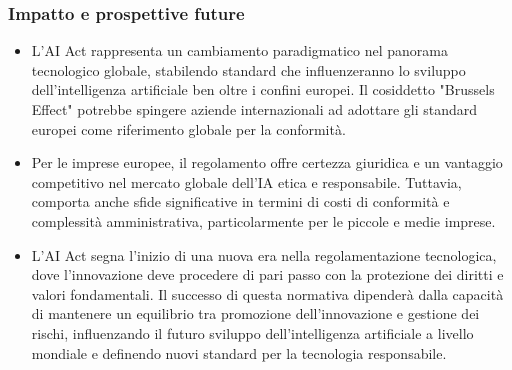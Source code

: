 \documentclass{beamer}
\begin{document}
%
%
\begin{frame}
\frametitle{Impatto e prospettive future}
\begin{itemize}
\small
\item L'AI Act rappresenta un cambiamento paradigmatico nel panorama tecnologico globale, stabilendo standard che influenzeranno lo sviluppo dell'intelligenza artificiale ben oltre i confini europei. Il cosiddetto "Brussels Effect" potrebbe spingere aziende internazionali ad adottare gli standard europei come riferimento globale per la conformità.

\item Per le imprese europee, il regolamento offre certezza giuridica e un vantaggio competitivo nel mercato globale dell'IA etica e responsabile. Tuttavia, comporta anche sfide significative in termini di costi di conformità e complessità amministrativa, particolarmente per le piccole e medie imprese.

\item L'AI Act segna l'inizio di una nuova era nella regolamentazione tecnologica, dove l'innovazione deve procedere di pari passo con la protezione dei diritti e valori fondamentali. Il successo di questa normativa dipenderà dalla capacità di mantenere un equilibrio tra promozione dell'innovazione e gestione dei rischi, influenzando il futuro sviluppo dell'intelligenza artificiale a livello mondiale e definendo nuovi standard per la tecnologia responsabile.
\end{itemize}
\end{frame}
%
%
\end{document}
